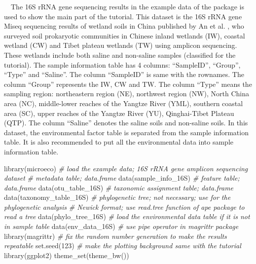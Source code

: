 \documentclass[
]{book}
\newenvironment{Shaded}{\begin{snugshade}}{\end{snugshade}}
\newcommand{\CommentTok}[1]{\textcolor[rgb]{0.56,0.35,0.01}{\textit{#1}}}
\newcommand{\DecValTok}[1]{\textcolor[rgb]{0.00,0.00,0.81}{#1}}
\newcommand{\FunctionTok}[1]{\textcolor[rgb]{0.00,0.00,0.00}{#1}}
\newcommand{\NormalTok}[1]{#1}
\begin{document}
　The 16S rRNA gene sequencing results in the example data of the package is used to show the main part of the tutorial.
This dataset is the 16S rRNA gene Miseq sequencing results of wetland soils in China published by An et al. \citep{An_Soil_2019},
who surveyed soil prokaryotic communities in Chinese inland wetlands (IW),
coastal wetland (CW) and Tibet plateau wetlands (TW) using amplicon sequencing.
These wetlands include both saline and non-saline samples (classified for the tutorial).
The sample information table has 4 columns: ``SampleID'', ``Group'', ``Type'' and ``Saline''.
The column ``SampleID'' is same with the rownames.
The column ``Group'' represents the IW, CW and TW.
The column ``Type'' means the sampling region: northeastern region (NE), northwest region (NW), North China area (NC),
middle-lower reaches of the Yangtze River (YML), southern coastal area (SC), upper reaches of the Yangtze River (YU), Qinghai-Tibet Plateau (QTP).
The column ``Saline'' denotes the saline soils and non-saline soils.
In this dataset, the environmental factor table is separated from the sample information table.
It is also recommended to put all the environmental data into sample information table.

\begin{Shaded}
\begin{Highlighting}[]
\FunctionTok{library}\NormalTok{(microeco)}
\CommentTok{\# load the example data; 16S rRNA gene amplicon sequencing dataset}
\CommentTok{\# metadata table; data.frame}
\FunctionTok{data}\NormalTok{(sample\_info\_16S)}
\CommentTok{\# feature table; data.frame}
\FunctionTok{data}\NormalTok{(otu\_table\_16S)}
\CommentTok{\# taxonomic assignment table; data.frame}
\FunctionTok{data}\NormalTok{(taxonomy\_table\_16S)}
\CommentTok{\# phylogenetic tree; not necessary; use for the phylogenetic analysis}
\CommentTok{\# Newick format; use read.tree function of ape package to read a tree}
\FunctionTok{data}\NormalTok{(phylo\_tree\_16S)}
\CommentTok{\# load the environmental data table if it is not in sample table}
\FunctionTok{data}\NormalTok{(env\_data\_16S)}
\CommentTok{\# use pipe operator in magrittr package}
\FunctionTok{library}\NormalTok{(magrittr)}
\CommentTok{\# fix the random number generation to make the results repeatable}
\FunctionTok{set.seed}\NormalTok{(}\DecValTok{123}\NormalTok{)}
\CommentTok{\# make the plotting background same with the tutorial}
\FunctionTok{library}\NormalTok{(ggplot2)}
\FunctionTok{theme\_set}\NormalTok{(}\FunctionTok{theme\_bw}\NormalTok{())}
\end{Highlighting}
\end{Shaded}
\end{document}
